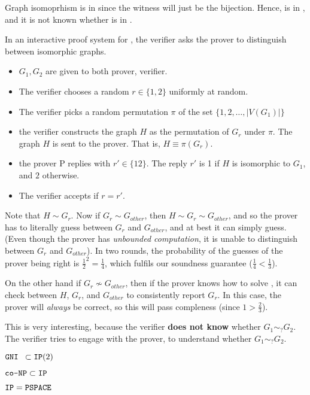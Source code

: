 Graph isomoprhism is in \nptime since the witness will just be the bijection.
Hence, \gni is in \conptime, and it is not known whether \gni is in \nptime.

In an interactive proof system for \gni, the verifier asks the prover to
distinguish between isomorphic graphs.

\begin{itemize}
\item $G_1, G_2$ are given to both prover, verifier.

\item The verifier chooses a random  $r \in \{1, 2\}$ uniformly at random.

\item The verifier picks a random permutation $\pi$ of the set $\{1, 2,\dots, |V(G_1)|\}$

\item the verifier constructs the graph $H$ as the permutation of $G_r$ under $\pi$.
The graph $H$ is sent to the prover. That is, $H \equiv \pi(G_r)$.

\item the prover P replies with $r' \in \{1 2\}$. The reply $r'$ is 1
if $H$ is isomorphic to $G_1$, and $2$ otherwise.

\item The verifier accepts if $r = r'$.
\end{itemize}

Note that $H \sim G_r$. Now if $G_r \sim G_{other}$, then $H \sim G_r \sim G_{other}$, and
so the prover has to literally guess between $G_r$ and $G_{other}$, and at best
it can simply guess. (Even though the prover has \textit{unbounded computation},
it is unable to distinguish between $G_r$ and $G_{other}$). In two rounds,
the probability of the guesses of the prover being right is $\frac{1}{2}^2 = \frac{1}{4}$,
which fulfils our soundness guarantee ($\frac{1}{4} < \frac{1}{3}$).

On the other hand if $G_r \nsim G_{other}$, then if the prover knows how to solve
\gni , it can check between $H$, $G_r$, and $G_{other}$ to consistently
report $G_r$. In this case, the prover will \textit{always} be correct,
so this will pass compleness (since $1 > \frac{2}{3}$).

This is very interesting, because the verifier \textbf{does not know} whether
$G_1 \sim_? G_2$. The verifier tries to engage with the prover, to understand
whether $G_1 \sim_? G_2$.

\begin{theorem}
$\texttt{GNI } \subset \texttt{IP} (2)$
\end{theorem}

\begin{theorem}
$\texttt{co-NP} \subset \texttt{IP}$
\end{theorem}

\begin{theorem}
$\texttt{IP} = \texttt{PSPACE}$
\end{theorem}
